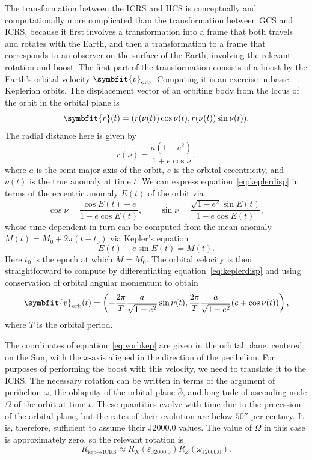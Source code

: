 \documentclass[b5paper, 10pt, twoside]{book}
\renewcommand{\vec}[1]{\symbfit{#1}}
\begin{document}
The transformation between the ICRS and HCS is conceptually and computationally more complicated than the transformation between GCS and ICRS, because it first involves a transformation into a frame that both travels and rotates with the Earth, and then a transformation to a frame that corresponds to an observer on the surface of the Earth, involving the relevant rotation and boost. The first part of the transformation consists of a boost by the Earth's orbital velocity $\vec{v}_\text{orb}$. Computing it is an exercise in basic Keplerian orbits. The displacement vector of an orbiting body from the locus of the orbit in the orbital plane is
\begin{equation}
    \vec{r}(t)=(r(\nu(t))\cos\nu(t),r(\nu(t))\sin\nu(t)).
    \label{eq:keplerdisp}
\end{equation}
The radial distance here is given by
\begin{equation}
    r(\nu)=\frac{a(1-e^2)}{1+e\cos\nu},
\end{equation}
where $a$ is the semi-major axis of the orbit, $e$ is the orbital eccentricity, and $\nu(t)$ is the true anomaly at time $t$. We can express equation~\eqref{eq:keplerdisp} in terms of the eccentric anomaly $E(t)$ of the orbit via
\begin{equation}
    \cos\nu=\frac{\cos E(t)-e}{1-e\cos E(t)},\qquad\sin\nu=\frac{\sqrt{1-e^2}\sin E(t)}{1-e\cos E(t)},
\end{equation}
whose time dependent in turn can be computed from the mean anomaly $M(t)=M_0+2\pi(t-t_0)$ via Kepler's equation
\begin{equation}
    E(t)-e\sin E(t)=M(t).
\end{equation}
Here $t_0$ is the epoch at which $M=M_0$. The orbital velocity is then straightforward to compute by differentiating equation~\eqref{eq:keplerdisp} and using conservation of orbital angular momentum to obtain
\begin{equation}
    \vec{v}_\text{orb}(t)=\left(-\frac{2\pi}{T}\frac{a}{\sqrt{1-e^2}}\sin\nu(t),\frac{2\pi}{T}\frac{a}{\sqrt{1-e^2}}(e+\cos\nu(t))\right),
    \label{eq:vorbkep}
\end{equation}
where $T$ is the orbital period.

The coordinates of equation~\eqref{eq:vorbkep} are given in the orbital plane, centered on the Sun, with the $x$-axis aligned in the direction of the perihelion. For purposes of performing the boost with this velocity, we need to translate it to the ICRS. The necessary rotation can be written in terms of the argument of perihelion $\omega$, the obliquity of the orbital plane $\bar{\phi}$, and longitude of ascending node $\Omega$ of the orbit at time $t$. These quantities evolve with time due to the precession of the orbital plane, but the rates of their evolution are below $50''$ per century. It is, therefore, sufficient to assume their J2000.0 values. The value of $\Omega$ in this case is approximately zero, so the relevant rotation is
\begin{equation}
    R_{\text{kep}\rightarrow\text{ICRS}}\approx R_X(\varepsilon_\text{J2000.0})R_Z(\omega_\text{J2000.0}).
\end{equation}
\end{document}
